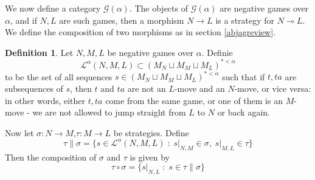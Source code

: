 \documentclass[11pt]{article} %
\theoremstyle{plain} %
\theoremstyle{definition} %
\newtheorem{definition}[theorem]{Definition}
\theoremstyle{exercisestyle}
\newcommand*\from{\colon}
\newcommand{\cmap}[3]{#1\from{}#2\to{}#3}
\renewcommand{\implies}{\multimap}
\newcommand{\comp}[2]{#1 \circ #2}
\newcommand{\cprd}{\sqcup}
\newcommand{\G}{\mathcal G}
\newcommand{\suchthat}{\;\colon\;}
\renewcommand{\L}{\mathcal L}
\begin{document}
We now define a category $\G(\alpha)$.  The objects of $\G(\alpha)$ are negative games over $\alpha$, and if $N,L$ are such games, then a morphism $N\to L$ is a strategy for $N\implies L$.  We define the composition of two morphisms as in section \ref{abjagreview}.

\begin{definition}
  Let $N,M,L$ be negative games over $\alpha$.  Definie
  \[
    \L^\alpha(N,M,L)\subset(M_N\cprd M_M\cprd M_L)^{*<\alpha}
  \]
  to be the set of all sequences $s\in(M_N\cprd M_M\cprd M_L)^{*<\alpha}$ such that if $t,ta$ are subsequences of $s$, then $t$ and $ta$ are not an $L$-move and an $N$-move, or vice versa: in other words, either $t,ta$ come from the same game, or one of them is an $M$-move - we are not allowed to jump straight from $L$ to $N$ or back again.
  
  Now let $\cmap{\sigma}{N}{M}$,$\cmap{\tau}{M}{L}$ be strategies.  Define
  \[
    \tau\|\sigma = \{s\in\L^\alpha(N,M,L)\suchthat s\vert_{N,M}\in \sigma,\; s\vert_{M,L}\in\tau\}
  \]
  Then the composition of $\sigma$ and $\tau$ is given by
  \[
    \comp\tau\sigma=\{s\vert_{N,L}\suchthat s\in\tau\|\sigma\}
  \]
\end{definition}
\end{document}
